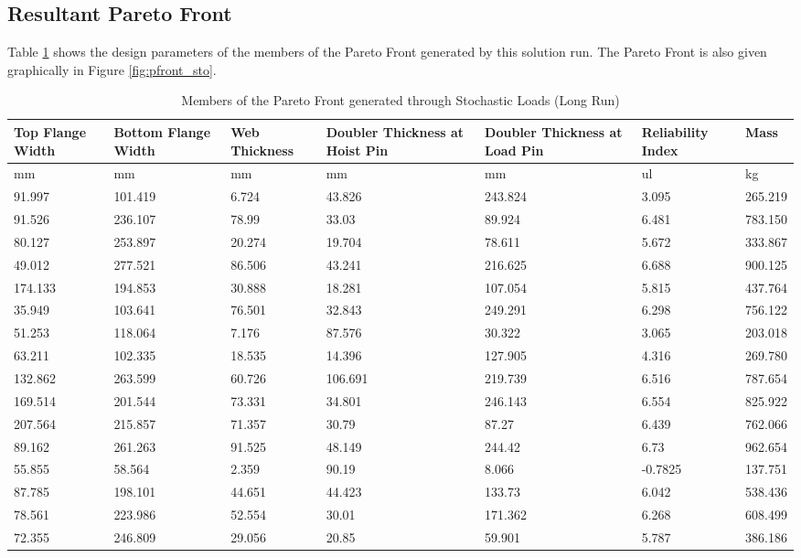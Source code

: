 \subsection{Resultant Pareto Front}
Table \ref{tab:pfront_sto} shows the design parameters of the members of the Pareto Front generated by this solution run. The Pareto Front is also given graphically in Figure \ref{fig:pfront_sto}. 
\begin{table}[!htbp]
\centering
\small
\begin{tabular}{|p{1.5cm}p{1.5cm}p{1.4cm}p{2cm}p{2cm}p{1.5cm}p{1.5cm}|}
\hline
Top Flange Width&Bottom Flange Width&Web Thickness&Doubler Thickness at Hoist Pin&Doubler Thickness at Load Pin&Reliability Index& Mass\\
\hline
mm&mm&mm&mm&mm&ul&kg\\
\hline
91.997&101.419&6.724&43.826&243.824&3.095&265.219\\
91.526&236.107&78.99&33.03&89.924&6.481&783.150\\
80.127&253.897&20.274&19.704&78.611&5.672&333.867\\
49.012&277.521&86.506&43.241&216.625&6.688&900.125\\
174.133&194.853&30.888&18.281&107.054&5.815&437.764\\
35.949&103.641&76.501&32.843&249.291&6.298&756.122\\
51.253&118.064&7.176&87.576&30.322&3.065&203.018\\
63.211&102.335&18.535&14.396&127.905&4.316&269.780\\
132.862&263.599&60.726&106.691&219.739&6.516&787.654\\
169.514&201.544&73.331&34.801&246.143&6.554&825.922\\
207.564&215.857&71.357&30.79&87.27&6.439&762.066\\
89.162&261.263&91.525&48.149&244.42&6.73&962.654\\
55.855&58.564&2.359&90.19&8.066&-0.7825&137.751\\
87.785&198.101&44.651&44.423&133.73&6.042&538.436\\
78.561&223.986&52.554&30.01&171.362&6.268&608.499\\
72.355&246.809&29.056&20.85&59.901&5.787&386.186\\
\hline
\end{tabular}
	\caption{Members of the Pareto Front generated through Stochastic Loads (Long Run)}
\label{tab:pfront_sto}
\end{table}

